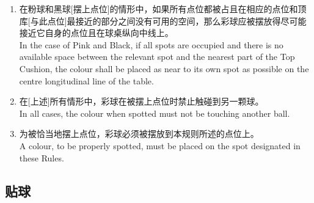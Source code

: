 \begin{enumerate}[label=(\alph*)]
    \item 在粉球和黑球[摆上点位]的情形中，如果所有点位都被占且在相应的点位和顶库[与此点位]最接近的部分之间没有可用的空间，那么彩球应被摆放得尽可能接近它自身的点位且在球桌纵向中线上。\\
    In the case of Pink and Black, if all spots are occupied and there is no available space between the relevant spot and the nearest part of the Top Cushion, the colour shall be placed as near to its own spot as possible on the centre longitudinal line of the table.
    \item 在[上述]所有情形中，彩球在被摆上点位时禁止触碰到另一颗球。\\
    In all cases, the colour when spotted must not be touching another ball.
    \item 为被恰当地摆上点位，彩球必须被摆放到本规则所述的点位上。\\
    A colour, to be properly spotted, must be placed on the spot designated in these Rules.
\end{enumerate}

\subsection{贴球}

